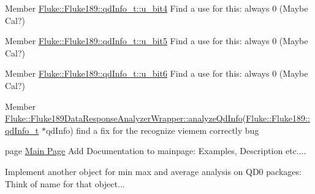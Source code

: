 \label{todo__todo000012}
\hypertarget{todo__todo000012}{}
 
\begin{DoxyDescription}
\item[Member \hyperlink{structFluke_1_1Fluke189_1_1qdInfo__t_a012174b29b7e6686a724204f63a09c91}{Fluke::Fluke189::qdInfo\_\-t::u\_\-bit4} ]Find a use for this: always 0 (Maybe Cal?) 
\end{DoxyDescription}

\label{todo__todo000013}
\hypertarget{todo__todo000013}{}
 
\begin{DoxyDescription}
\item[Member \hyperlink{structFluke_1_1Fluke189_1_1qdInfo__t_ad123acd44f39185d0903250085834b72}{Fluke::Fluke189::qdInfo\_\-t::u\_\-bit5} ]Find a use for this: always 0 (Maybe Cal?) 
\end{DoxyDescription}

\label{todo__todo000014}
\hypertarget{todo__todo000014}{}
 
\begin{DoxyDescription}
\item[Member \hyperlink{structFluke_1_1Fluke189_1_1qdInfo__t_a3a48f6b82d6abd8613a7f7f091c7ad16}{Fluke::Fluke189::qdInfo\_\-t::u\_\-bit6} ]Find a use for this: always 0 (Maybe Cal?) 
\end{DoxyDescription}

\label{todo__todo000022}
\hypertarget{todo__todo000022}{}
 
\begin{DoxyDescription}
\item[Member \hyperlink{classFluke_1_1Fluke189DataResponseAnalyzerWrapper_a2bec1dad601bc993375d358ef77c7e6b}{Fluke::Fluke189DataResponseAnalyzerWrapper::analyzeQdInfo}(\hyperlink{structFluke_1_1Fluke189_1_1qdInfo__t}{Fluke::Fluke189::qdInfo\_\-t} $\ast$qdInfo) ]find a fix for the recognize viemem correctly bug 
\end{DoxyDescription}

\label{todo__todo000001}
\hypertarget{todo__todo000001}{}
 
\begin{DoxyDescription}
\item[page \hyperlink{index}{Main Page} ]Add Documentation to mainpage: Examples, Description etc.... 

Implement another object for min max and average analysis on QD0 packages: Think of name for that object... 
\end{DoxyDescription}